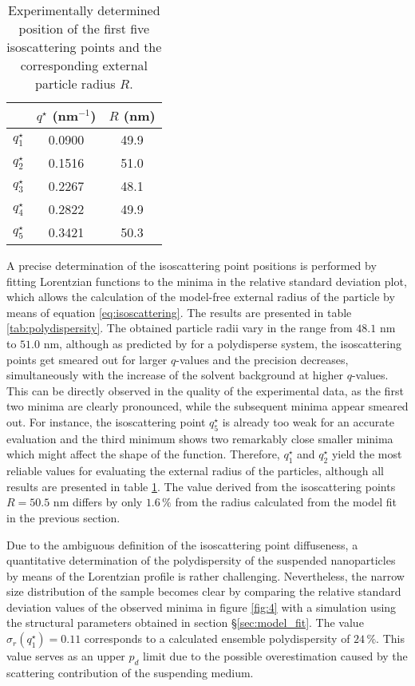 \begin{table}
\caption{Experimentally determined position of the first five isoscattering points and the corresponding external particle radius $R$.}
\begin{tabular}{l|cc}
 & \( q^{\star} \) (nm\(^{-1}\))    &  \(R\) (nm) \\
\hline
 \(q^{\star}_1\) &  0.0900 & 49.9 \\
 \(q^{\star}_2\) &  0.1516 & 51.0  \\
 \(q^{\star}_3\) &  0.2267 & 48.1   \\
 \(q^{\star}_4\) &  0.2822 & 49.9    \\
 \(q^{\star}_5\) &  0.3421 & 50.3     \\
\end{tabular}
\label{tab:isopoint_Kisker}
\end{table}

A precise determination of the isoscattering point positions is performed by fitting Lorentzian functions to the minima in the relative standard deviation plot, which allows the calculation of the model-free external radius of the particle by means of equation \eqref{eq:isoscattering}. The results are presented in table \ref{tab:polydispersity}. The obtained particle radii vary in the range from \(48.1\) nm to \(51.0\) nm, although as predicted by \cite{Kawaguchi1992} for a polydisperse system, the isoscattering points get smeared out for larger \( q \)-values and the precision decreases, simultaneously with the increase of the solvent background at higher \(q\)-values. This can be directly observed in the quality of the experimental data, as the first two minima are clearly pronounced, while the subsequent minima appear smeared out. For instance, the isoscattering point \(q^{\star}_5\) is already too weak for an accurate evaluation and the third minimum shows two remarkably close smaller minima which might affect the shape of the function. Therefore, \(q^{\star}_1\) and \(q^{\star}_2\) yield the most reliable values for evaluating the external radius of the particles, although all results are presented in table \ref{tab:isopoint_Kisker}. The value derived from the isoscattering points \(R=50.5\) nm differs by only \(1.6\,\%\) from the radius calculated from the model fit in the previous section.

Due to the ambiguous definition of the isoscattering point diffuseness, a quantitative determination of the polydispersity of the suspended nanoparticles by means of the Lorentzian profile is rather challenging. Nevertheless, the narrow size distribution of the sample becomes clear by comparing the relative standard deviation values of the observed minima in figure \ref{fig:4} with a simulation using the structural parameters obtained in section \S\ref{sec:model_fit}. The value \( \sigma_r(q^{\star}_1)=0.11 \) corresponds to a calculated ensemble polydispersity of \(24\,\% \). This value serves as an upper \( p_d \) limit due to the possible overestimation caused by the scattering contribution of the suspending medium.


